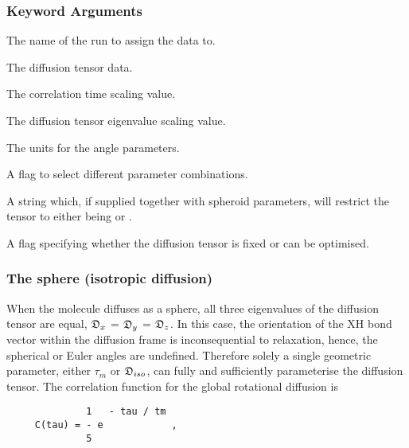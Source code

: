   
 \subsubsection{Keyword Arguments} 

   The name of the run to assign the data to.   

   The diffusion tensor data.   

   The correlation time scaling value.   

   The diffusion tensor eigenvalue scaling value.   

   The units for the angle parameters.   

   A flag to select different parameter combinations.   

   A string which, if supplied together with spheroid parameters, will restrict the tensor to either being  or .   

   A flag specifying whether the diffusion tensor is fixed or can be optimised.  

  

  
 \subsubsection{The sphere (isotropic diffusion)} 

 When the molecule diffuses as a sphere, all three eigenvalues of the diffusion tensor are equal, $\mathfrak{D}_x$ = $\mathfrak{D}_y$ = $\mathfrak{D}_z$.  In this case, the orientation of the XH bond vector within the diffusion frame is inconsequential to relaxation, hence, the spherical or Euler angles are undefined.  Therefore solely a single geometric parameter, either $\tau_m$ or $\mathfrak{D}_{iso}$, can fully and sufficiently parameterise the diffusion tensor.  The correlation function for the global rotational diffusion is 
  

 {\footnotesize \begin{verbatim} 
              1   - tau / tm 
     C(tau) = - e            , 
              5 
 \end{verbatim}} 

